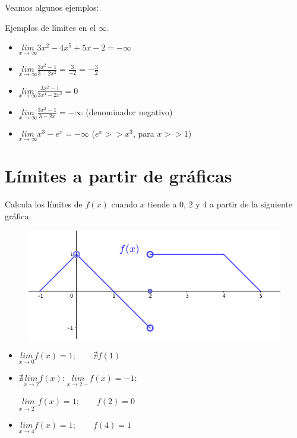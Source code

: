 	
	 Veamos algunos ejemplos:
	
	\begin{ejem}Ejemplos de límites en el $\infty$.
	\begin{multicols}{2}
	\begin{itemize}
		\item $\underset {x \to \infty }{lim}{3x^2-4x^5+5x-2}=-\infty  $
		\item $\underset {x \to \infty }{lim}{\frac {3x^2-1}{3-2x^2}}=\frac {3}{-2}=-\frac 3 2  $
		\item $\underset {x \to \infty }{lim}{\frac {3x^2-1}{3x^4-2x^2}}=0$
		\item $\underset {x \to \infty }{lim}{\frac {3x^2-1}{3-2x}}=-\infty$ (denominador negativo)
		\item $\underset {x \to \infty }{lim}{x^3-e^x}=-\infty$ ($e^x>>x^3$, para $x>>1$)
	\end{itemize}	
	\end{multicols}
	\end{ejem}
	
	

	 
	\section{Límites a partir de gráficas}
	
		\begin{ejem} Calcula los límites de $f(x)$ cuando $x$ tiende a $0$, $2$ y $4$ a partir de la siguiente gráfica.
		
	    \begin{multicols}{2}
	    
		\begin{figure}[H]
			\centering
			\includegraphics[width=0.5
			\textwidth]{imagenes/imagenes03/T03IM01.png}
		\end{figure}
		
		\begin{itemize}
			\item $\underset { x\rightarrow 0}{ lim } {f(x)}=1; \qquad \nexists f(1)$
			\item $\nexists \underset { x\rightarrow 2}{ lim } {f(x)}\text{:} \;  \underset { x\rightarrow 2-}{ lim } {f(x)}=-1; $
			
			$  \underset { x\rightarrow 2^+}{ lim } {f(x)}=1; \qquad  f(2)=0$
			\item $\underset { x\rightarrow 4}{ lim } {f(x)}=1; \qquad f(4)=1$
		\end{itemize}
	
	   \end{multicols}
	   
	   \end{ejem}
	   
